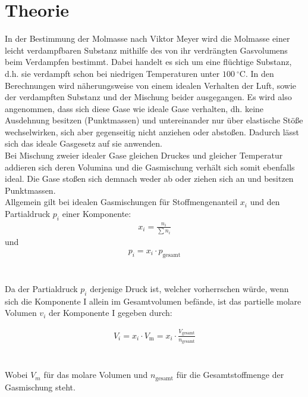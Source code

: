 \documentclass[12pt,a4paper,titlepage,headinclude,bibtotoc]{scrartcl}
\begin{document}
\section{Theorie}
In der Bestimmung der Molmasse nach Viktor Meyer wird die Molmasse einer leicht verdampfbaren Substanz mithilfe des von ihr verdrängten Gasvolumens beim Verdampfen bestimmt. Dabei handelt es sich um eine flüchtige Substanz, d.h. sie verdampft schon bei niedrigen Temperaturen unter $100{~}^{\circ}$C. In den Berechnungen wird näherungsweise von einem idealen Verhalten der Luft, sowie der verdampften Substanz und der Mischung beider ausgegangen. Es wird also angenommen, dass sich diese Gase wie ideale Gase verhalten, dh. keine Ausdehnung besitzen (Punktmassen)  und untereinander nur über elastische Stöße wechselwirken, sich aber gegenseitig nicht anziehen oder abstoßen. Dadurch lässt sich das ideale Gasgesetz auf sie anwenden.\\

Bei Mischung zweier idealer Gase gleichen Druckes und gleicher Temperatur addieren sich deren Volumina und die Gasmischung verhält sich somit ebenfalls ideal. Die Gase stoßen sich demnach weder ab oder ziehen sich an und besitzen Punktmassen.\\

Allgemein gilt bei idealen Gasmischungen für Stoffmengenanteil $x_i$ und den Partialdruck $p_i$ einer Komponente: 
\begin{align}
x_i = \frac{n_i}{\sum n_i}
\end{align}
und
\begin{align}
p_i = x_i \cdot p_{\mathrm{gesamt}}
\end{align}\\\\

Da der Partialdruck $p_i$ derjenige Druck ist, welcher vorherrschen würde, wenn sich die Komponente I allein im Gesamtvolumen befände, ist das partielle molare Volumen  $v_i$ der Komponente I gegeben durch:

\begin{align}
V_i = x_i \cdot V_{\mathrm{m}}= x_i \cdot \frac{ V_{\mathrm{gesamt}}} {n_{\mathrm{gesamt}}}
\end{align}\\\\

Wobei $ V_m $ für das molare Volumen und $n_{\mathrm{gesamt}}$ für die Gesamtstoffmenge der Gasmischung steht.\\\\
\end{document}
